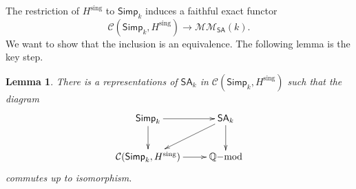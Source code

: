 \documentclass[11pt,a4paper]{amsart}
\newtheorem{lemma}{Lemma}[section]
\theoremstyle{definition}
\newcommand{\MMSA}{\mathcal{MM}_{\SA}}
\newcommand{\Ch}{\mathcal{C}}
\newcommand{\Qmod}{\Q\mathrm{-mod}}
\newcommand{\sing}{\mathrm{sing}}
\newcommand{\Hsing}{H^\sing}
\newcommand{\Hsingtilde}{\tilde{H}^\sing}
\newcommand{\SA}{\mathsf{SA}}
\newcommand{\GSA}{\mathsf{GSA}}
\newcommand{\Simp}{\mathsf{Simp}}
\newcommand{\Q}{\mathbb{Q}}
\begin{document}
%
The restriction of $\Hsing$ to %
$\Simp_k$ induces a faithful exact functor
\[ \Ch(\Simp_k,\Hsing)\to \MMSA(k).\]
We want to show that the inclusion is an equivalence.
%
%
The following lemma is the key step.

\begin{lemma}
There is a representations of $\SA_k$ in $\Ch(\Simp_k,\Hsing)$ 
such that the diagram
\[\begin{xy}\xymatrix{
 \Simp_k\ar[d]\ar[r]& \SA_k\ar[d]\ar[dl]\\
  \Ch(\Simp_k,\Hsing)\ar[r]& \Qmod
}\end{xy}\]
commutes up to isomorphism.
\end{lemma}
\end{document}
